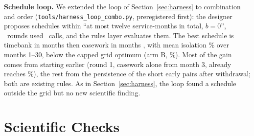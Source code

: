 \documentclass[10pt,twocolumn]{article}
\begin{document}
\textbf{Schedule loop.} We extended the loop of Section~\ref{sec:harness} to combination and order (\texttt{tools/harness\_loop\_combo.py}, preregistered first): the designer proposes schedules within ``at most twelve service-months in total, $b=0$'', \CbHlRounds\ rounds used \CallsHarnessCombo\ calls, and the rules layer evaluates them. The best schedule is timebank in months \CbHlBestTb{} then casework in months \CbHlBestCw, with mean isolation \CbHlBest\% over months 1--30, below the capped grid optimum (arm B, \CbHlGridBest\%). Most of the gain comes from starting earlier (round 1, casework alone from month 3, already reaches \CbHlFirst\%), the rest from the persistence of the short early pairs after withdrawal; both are existing rules. As in Section~\ref{sec:harness}, the loop found a schedule outside the grid but no new scientific finding.

\begin{table}[t]
\centering\small
\caption{Combined interventions (rules layer: 20 seeds, calibrated profiles, $b=0$; LLM layer: fixed-router gpt-6-astra seed~1, single run). Isolation is the window mean (\%), loneliness the post-withdrawal mean; post-withdrawal is months 19--30 in the rules layer and 19--24 in the LLM layer.}
\label{tab:combo}
\end{table}

\section{Scientific Checks}\label{sec:honest}
\end{document}

